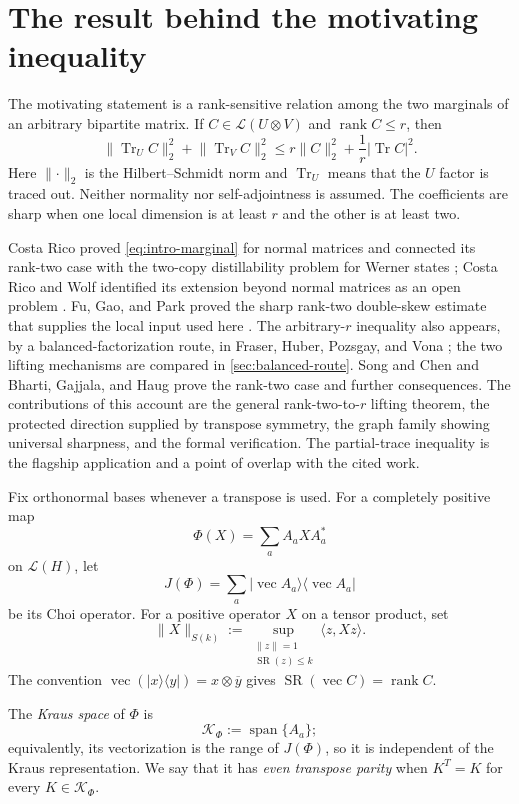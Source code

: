\documentclass[11pt,reqno]{amsart}
\theoremstyle{remark}
\DeclareMathOperator{\Tr}{Tr}
\DeclareMathOperator{\rank}{rank}
\DeclareMathOperator{\SR}{SR}
\newcommand{\cL}{\mathcal L}
\newcommand{\ip}[2]{\langle #1,#2\rangle}
\newcommand{\norm}[1]{\lVert #1\rVert}
\newcommand{\abs}[1]{\lvert #1\rvert}
\newcommand{\ketbra}[2]{\lvert #1\rangle\!\langle #2\rvert}
\newcommand{\vecop}{\operatorname{vec}}
\begin{document}
\section{The result behind the motivating inequality}

The motivating statement is a rank-sensitive relation among the two
marginals of an arbitrary bipartite matrix.  If
$C\in\cL(U\otimes V)$ and $\rank C\le r$, then
\begin{equation}
\label{eq:intro-marginal}
  \norm{\Tr_U C}_2^2+\norm{\Tr_V C}_2^2
  \le r\norm C_2^2+\frac1r\abs{\Tr C}^2.
\end{equation}
Here $\norm\cdot_2$ is the Hilbert--Schmidt norm and $\Tr_U$ means that
the $U$ factor is traced out.  Neither normality nor self-adjointness is
assumed.  The coefficients are sharp when one local dimension is at least
$r$ and the other is at least two.

Costa Rico proved \cref{eq:intro-marginal} for normal matrices and connected
its rank-two case with the two-copy distillability problem for Werner states
\cite{CostaRico}; Costa Rico and Wolf identified its extension beyond normal
matrices as an open problem \cite{CostaRicoWolf}.  Fu, Gao, and Park proved the
sharp rank-two double-skew estimate that supplies the local input used here
\cite{FuGaoPark2026}.  The arbitrary-$r$ inequality also appears, by a
balanced-factorization route, in Fraser, Huber, Pozsgay, and Vona
\cite{FraserHuberPozsgayVona2026}; the two lifting mechanisms are compared in
\cref{sec:balanced-route}.  Song and Chen
\cite{SongChen2026} and Bharti, Gajjala, and Haug
\cite{BhartiGajjalaHaug2026} prove the rank-two case and further consequences.
The contributions of this account are the general rank-two-to-$r$ lifting
theorem, the protected direction supplied by transpose symmetry, the graph
family showing universal sharpness, and the formal verification.  The
partial-trace inequality is the flagship application and a point of overlap
with the cited work.

Fix orthonormal bases whenever a transpose is used.  For a completely positive
map
\[
  \Phi(X)=\sum_a A_aXA_a^*
\]
on $\cL(H)$, let
\[
  J(\Phi)=\sum_a
  \ketbra{\vecop A_a}{\vecop A_a}
\]
be its Choi operator.  For a positive operator $X$ on a tensor product, set
\[
  \norm X_{S(k)}
  :=\sup_{\substack{\norm z=1\\\SR(z)\le k}}\ip z{Xz}.
\]
The convention $\vecop(\ketbra{x}{y})=x\otimes\overline y$ gives
$\SR(\vecop C)=\rank C$.

The \emph{Kraus space} of $\Phi$ is
\[
  \mathcal K_\Phi:=\operatorname{span}\{A_a\};
\]
equivalently, its vectorization is the range of $J(\Phi)$, so it is
independent of the Kraus representation.  We say that it has
\emph{even transpose parity} when $K^T=K$ for every
$K\in\mathcal K_\Phi$.
\end{document}
